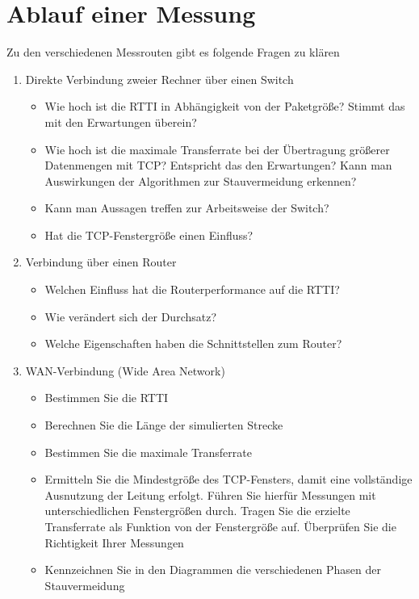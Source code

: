\documentclass[a4paper,10pt]{article}
\begin{document}
\section{Ablauf einer Messung}
Zu den verschiedenen Messrouten gibt es folgende Fragen zu kl\"aren
\begin{enumerate}
 \item Direkte Verbindung zweier Rechner \"uber einen Switch
 \begin{itemize}
  \item Wie hoch ist die RTTI in Abhängigkeit von der Paketgröße?
  Stimmt das mit den Erwartungen überein?
  \item Wie hoch ist die maximale Transferrate bei der Übertragung größerer Datenmengen
  mit TCP? Entspricht das den Erwartungen? Kann man Auswirkungen der Algorithmen zur Stauvermeidung erkennen?
  \item Kann man Aussagen treffen zur Arbeitsweise der Switch?
  \item Hat die TCP-Fenstergröße einen Einfluss?
 \end{itemize}
 \item Verbindung über einen Router
 \begin{itemize}
  \item Welchen Einfluss hat die Routerperformance auf die RTTI?
  \item Wie verändert sich der Durchsatz?
  \item Welche Eigenschaften haben die Schnittstellen zum Router?
 \end{itemize}
 \item WAN-Verbindung (Wide Area Network)
 \begin{itemize}
  \item Bestimmen Sie die RTTI
  \item Berechnen Sie die Länge der simulierten Strecke
  \item Bestimmen Sie die maximale Transferrate
  \item Ermitteln Sie die Mindestgröße des TCP-Fensters, damit eine vollständige Ausnutzung der Leitung erfolgt.
  Führen Sie hierfür Messungen mit unterschiedlichen Fenstergrößen durch. Tragen Sie die erzielte Transferrate als Funktion von der Fenstergröße auf.
  Überprüfen Sie die Richtigkeit Ihrer Messungen
  \item Kennzeichnen Sie in den Diagrammen die verschiedenen Phasen der Stauvermeidung
 \end{itemize}
\end{enumerate}
\end{document}
